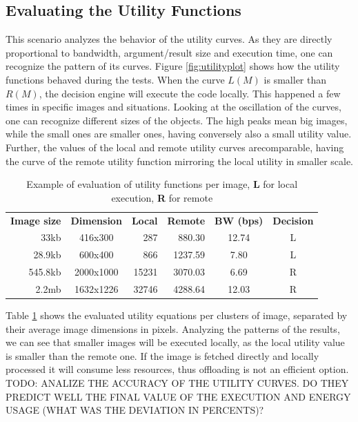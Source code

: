 \documentclass[10pt, conference, letterpaper]{IEEEtran}
\begin{document}
\subsection{Evaluating the Utility Functions}
  
This scenario analyzes the behavior of the utility curves.  As they are directly proportional to bandwidth, argument/result size and execution time, one can recognize the pattern of its curves. Figure \ref{fig:utilityplot} shows how the utility functions behaved during the tests. When the curve $L(M)$ is smaller than $R(M)$, the decision engine will execute the code locally. This happened a few times in specific images and situations. Looking at the oscillation of the curves, one can recognize different sizes of the objects. The high peaks mean big images, while the small ones are smaller ones, having conversely also a small utility value. Further,  the values of the local and remote utility curves arecomparable, having the curve of the remote utility function mirroring the local utility in smaller scale. 

  \begin{table}[t]
  \centering
  \caption{Example of evaluation of utility functions per image, \textbf{L} for local execution, \textbf{R} for remote}
  \label{table:utility}
  \begin{tabular}{rcrrcc}
    \textbf{Image size} & \textbf{Dimension} & \textbf{Local} & \textbf{Remote} & \textbf{BW (bps)} & \textbf{Decision} \\
   33kb & 416x300 & 287 & 880.30 & 12.74 & L \\
   28.9kb & 600x400  & 866 & 1237.59 & 7.80 & L \\
   545.8kb & 2000x1000  & 15231 & 3070.03 & 6.69 & R \\
   2.2mb & 1632x1226  & 32746 & 4288.64 & 12.03 & R \\
  \end{tabular}
  \end{table}

  Table \ref{table:utility} shows the evaluated utility equations per clusters of image, separated by their average image dimensions in pixels. Analyzing the patterns of the results, we can see that smaller images will be executed locally, as the local utility value is smaller than the remote one. If the image is fetched directly and locally processed it will consume less resources, thus offloading is not an efficient option. {\color{red} TODO: ANALIZE THE ACCURACY OF THE UTILITY CURVES. DO THEY PREDICT WELL THE FINAL VALUE OF THE EXECUTION AND ENERGY USAGE (WHAT WAS THE DEVIATION IN PERCENTS)? }
\end{document}
